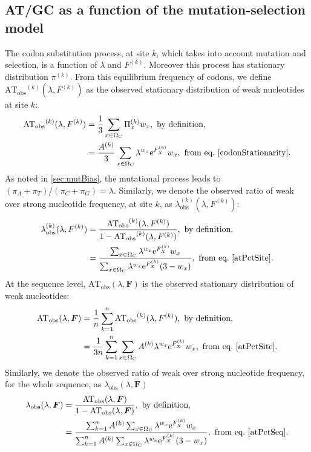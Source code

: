 \subsection{AT/GC as a function of the mutation-selection model}
The \gls{codon} \gls{substitution} process, at site $k$, which takes into account mutation and selection, is a function of $\lambda$ and $F^{(k)}$. Moreover this process has stationary distribution $\pi^{(k)}$. From this equilibrium frequency of \glspl{codon}, we define $\mathrm{AT_{obs}}^{(k)}(\lambda, F^{(k)})$ as the observed stationary distribution of weak nucleotides at site $k$:
\begin{align}
\mathrm{AT_{obs}}^{(k)}(\lambda, F^{(k)})
& =\frac{1}{3} \sum_{x \in \Omega_{\mathrm{C}}} \Pi_x^{(k)} w_x , \ \textrm{by definition},\\
& =\frac{A^{(k)}}{3} \sum_{x \in \Omega_{\mathrm{C}}} \lambda^{w_x} \mathrm{e}^{F_X^{(k)}} w_x , \ \textrm{from eq.} \ \ref{codonStationarity}.
\label{atPctSite}
\end{align}
As noted in \ref{sec:mutBias}, the mutational process leads to $(\pi_A+\pi_T)/(\pi_C+\pi_G) = \lambda$. Similarly, we denote the observed ratio of weak over strong nucleotide frequency, at site $k$, as $\lambda_{\mathrm{obs}}^{(k)} (\lambda, F^{(k)})$:
\begin{align}
\lambda_{\mathrm{obs}}^{(k)} (\lambda, F^{(k)})
& =\dfrac{\mathrm{AT_{obs}}^{(k)}(\lambda, F^{(k)})}{1 - \mathrm{AT_{obs}}^{(k)}(\lambda, F^{(k)}) }, \ \textrm{by definition},\\
& =\dfrac{ \sum_{x \in \SetCodon} \lambda^{w_x} \e^{F_X^{(k)}} w_x}{\sum_{x \in \SetCodon} \lambda^{w_x} \e^{F_X^{(k)}} (3 - w_x )}, \ \textrm{from eq.} \ \ref{atPctSite}.
\end{align}
At the sequence level, $\mathrm{AT_{obs}}(\lambda, \bm{F})$ is the observed stationary distribution of weak nucleotides:
\begin{align}
\mathrm{AT_{obs}}(\lambda, \bm{F})
& =\frac{1}{n}\sum_{k=1}^{n} \mathrm{AT_{obs}}^{(k)}(\lambda, F^{(k)}), \ \textrm{by definition}, \\
& =\frac{1}{3n}\sum_{k=1}^{n} \sum_{x \in \SetCodon} A^{(k)} \lambda^{w_x} \e^{F_X^{(k)}} w_x , \ \textrm{from eq.} \ \ref{atPctSite}.
\label{atPctSeq}
\end{align}
Similarly, we denote the observed ratio of weak over strong nucleotide frequency, for the whole sequence, as $\lambda_{\mathrm{obs}} (\lambda, \bm{F})$
\begin{align}
\lambda_{\mathrm{obs}} (\lambda, \bm{F})
& = \frac{\mathrm{AT_{obs}}(\lambda, \bm{F})}{ 1 - \mathrm{AT_{obs}}(\lambda, \bm{F}) }, \ \textrm{by definition},\\
& =\dfrac{ \sum_{k=1}^{n}  A^{(k)} \sum_{x \in \Omega_{\mathrm{C}}} \lambda^{w_x} \mathrm{e}^{F_X^{(k)}} w_x}{ \sum_{k=1}^{n} A^{(k)} \sum_{x \in \Omega_{\mathrm{C}}} \lambda^{w_x} \mathrm{e}^{F_X^{(k)}} (3 - w_x )}, \ \textrm{from eq.} \ \ref{atPctSeq}.
\end{align}
